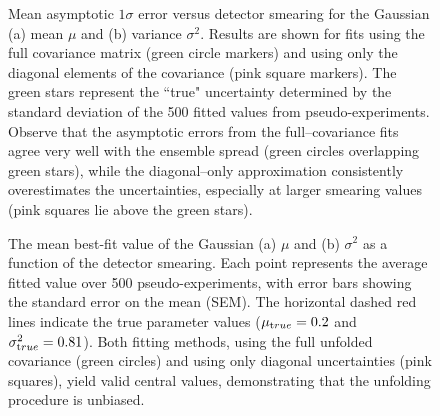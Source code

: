             \begin{figure}
                \centering
                \quad
                \caption{Mean asymptotic \(1\sigma\) error versus detector smearing for the Gaussian (a) mean $\mu$ and (b) variance $\sigma^2$.
                Results are shown for fits using the full covariance matrix (green circle markers) and using only the diagonal elements of the covariance (pink square markers).
                The green stars represent the ``true" uncertainty determined by the standard deviation of the 500 fitted values from pseudo-experiments.
                Observe that the asymptotic errors from the full--covariance fits agree very well with the ensemble spread (green circles overlapping green stars), while the diagonal--only approximation consistently overestimates the uncertainties, especially at larger smearing values (pink squares lie above the green stars).}
            \label{fig:uncertsfullybinned}
        \end{figure}
        \begin{figure}
            \centering
            \quad
            \caption{
                The mean best-fit value of the Gaussian (a) $\mu$ and (b) $\sigma^2$ as a function of the detector smearing.
                Each point represents the average fitted value over 500 pseudo-experiments, with error bars showing the standard error on the mean (SEM).
                The horizontal dashed red lines indicate the true parameter values ($\mu_{\text true}=0.2$ and $\sigma^2_{\text true}=0.81$).
                Both fitting methods, using the full unfolded covariance (green circles) and using only diagonal uncertainties (pink squares), yield valid central values, demonstrating that the unfolding procedure is unbiased.
            }
        \end{figure}
    
